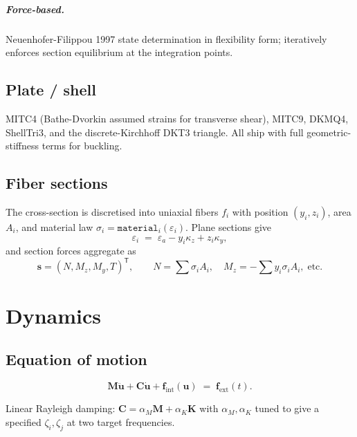 \documentclass[11pt,a4paper]{report}
\newcommand{\bs}[1]{\boldsymbol{#1}}
\begin{document}
\paragraph{Force-based.}  Neuenhofer-Filippou 1997 state determination
in flexibility form; iteratively enforces section equilibrium at the
integration points.

\section{Plate / shell}

MITC4 (Bathe-Dvorkin assumed strains for transverse shear), MITC9,
DKMQ4, ShellTri3, and the discrete-Kirchhoff DKT3 triangle.  All ship
with full geometric-stiffness terms for buckling.

\section{Fiber sections}

The cross-section is discretised into uniaxial fibers $f_i$ with
position $(y_i, z_i)$, area $A_i$, and material law $\sigma_i =
\mathtt{material}_i(\varepsilon_i)$.  Plane sections give
\begin{equation}
  \varepsilon_i \;=\; \varepsilon_a - y_i \kappa_z + z_i \kappa_y,
\end{equation}
and section forces aggregate as
\begin{equation}
  \bs s = (N, M_z, M_y, T)^{\mathsf T}, \qquad
  N = \sum \sigma_i A_i, \quad M_z = - \sum y_i \sigma_i A_i, \;\text{etc.}
\end{equation}

\chapter{Dynamics}
\label{ch:dynamics}

\section{Equation of motion}

\begin{equation}
  \bs M \ddot{\bs u} + \bs C \dot{\bs u} + \bs f_{\mathrm{int}}(\bs u)
  \;=\; \bs f_{\mathrm{ext}}(t).
\end{equation}

Linear Rayleigh damping: $\bs C = \alpha_M \bs M + \alpha_K \bs K$
with $\alpha_M, \alpha_K$ tuned to give a specified $\zeta_i, \zeta_j$
at two target frequencies.
\end{document}
